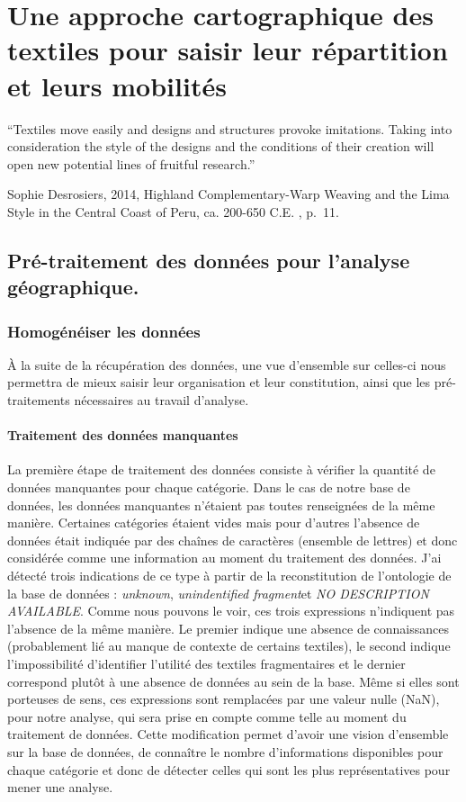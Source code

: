 \chapter{Une approche cartographique des textiles pour saisir leur répartition et leurs mobilités}
\markboth{}{}

\epigraph{\textquotedblleft Textiles move easily and designs and structures provoke imitations. Taking into consideration the style of the designs and the conditions of their creation will open new potential lines of fruitful research.\textquotedblright}{Sophie Desrosiers, 2014, \og Highland Complementary-Warp Weaving and the Lima Style in the Central Coast of Peru, ca. 200-650 C.E. \fg, p.~11.}


\section[Pré-traitement des données pour l'analyse géographique]{Pré-traitement des données pour l'analyse géographique.}

\subsection{Homogénéiser les données}

À la suite de la récupération des données, une vue d'ensemble sur celles-ci nous permettra de mieux saisir leur organisation et leur constitution, ainsi que les pré-traitements nécessaires au travail d'analyse.

\subsubsection{Traitement des données manquantes}

La première étape de traitement des données consiste à vérifier la quantité de données manquantes pour chaque catégorie. 
Dans le cas de notre base de données, les données manquantes n'étaient pas toutes renseignées de la même manière. 
Certaines catégories étaient vides mais pour d'autres l'absence de données était indiquée par des chaînes de caractères (ensemble de lettres) et donc considérée comme une information au moment du traitement des données. 
J'ai détecté trois indications de ce type à partir de la reconstitution de l'ontologie de la base de données : \og \textit{unknown}\fg, \og \textit{unindentified fragment}\fg \:et \og \textit{NO DESCRIPTION AVAILABLE}\fg. Comme nous pouvons le voir, ces trois expressions n'indiquent pas l'absence de la même manière. Le premier indique une absence de connaissances (probablement lié au manque de contexte de certains textiles), le second indique l'impossibilité d'identifier l'utilité des textiles fragmentaires et le dernier correspond plutôt à une absence de données au sein de la base. Même si elles sont porteuses de sens, ces expressions sont remplacées par une valeur nulle (NaN), pour notre analyse, qui sera prise en compte comme telle au moment du traitement de données. Cette modification permet d'avoir une vision d'ensemble sur la base de données, de connaître le nombre d'informations disponibles pour chaque catégorie et donc de détecter celles qui sont les plus représentatives pour mener une analyse.

